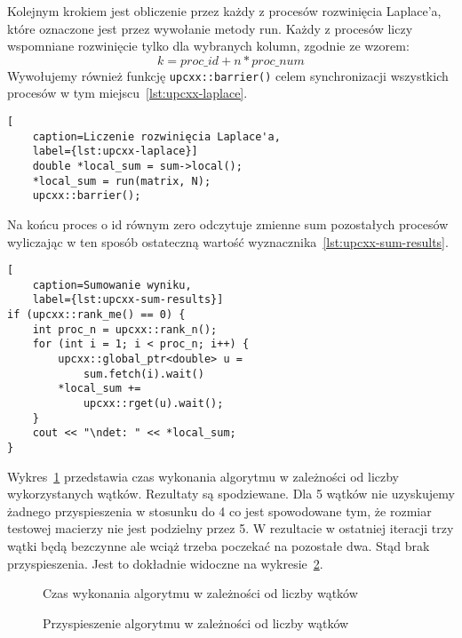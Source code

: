 Kolejnym krokiem jest obliczenie przez każdy z procesów
rozwinięcia Laplace'a, które oznaczone jest przez wywołanie metody run.
Każdy z procesów liczy wspomniane rozwinięcie tylko dla wybranych kolumn, zgodnie
ze wzorem:
\begin{equation}
    k = proc\_id + n*proc\_num
\end{equation}
Wywołujemy również funkcję \texttt{upcxx::barrier()} celem synchronizacji wszystkich
procesów w tym miejscu~\ref{lst:upcxx-laplace}.

\begin{lstlisting}[
    caption=Liczenie rozwinięcia Laplace'a,
    label={lst:upcxx-laplace}]
    double *local_sum = sum->local();
    *local_sum = run(matrix, N);
    upcxx::barrier();
\end{lstlisting}

Na końcu proces o id równym zero odczytuje zmienne sum pozostałych
procesów wyliczając w ten sposób ostateczną
wartość wyznacznika~\ref{lst:upcxx-sum-results}.

\begin{lstlisting}[
    caption=Sumowanie wyniku,
    label={lst:upcxx-sum-results}]
if (upcxx::rank_me() == 0) {
    int proc_n = upcxx::rank_n();
    for (int i = 1; i < proc_n; i++) {
        upcxx::global_ptr<double> u =
            sum.fetch(i).wait()
        *local_sum +=
            upcxx::rget(u).wait();
    }
    cout << "\ndet: " << *local_sum;
}
\end{lstlisting}

Wykres~\ref{fig:upcxx-matrixdet-time} przedstawia czas wykonania algorytmu w zależności
od liczby wykorzystanych wątków.
Rezultaty są spodziewane.
Dla 5 wątków nie uzyskujemy żadnego przyspieszenia w stosunku
do 4 co jest spowodowane tym, że rozmiar testowej macierzy nie jest podzielny przez 5.
W rezultacie w ostatniej iteracji trzy wątki będą bezczynne ale wciąż trzeba poczekać na
pozostałe dwa.
Stąd brak przyspieszenia.
Jest to dokładnie widoczne na wykresie~\ref{fig:upcxx-matrixdet-speedup}.

\begin{figure}[h]
    \centering
    
    \caption{Czas wykonania algorytmu w zależności od liczby wątków}
    \label{fig:upcxx-matrixdet-time}
\end{figure}

\begin{figure}[h]
    \centering
    
    \caption{Przyspieszenie algorytmu w zależności od liczby wątków}
    \label{fig:upcxx-matrixdet-speedup}
\end{figure}
